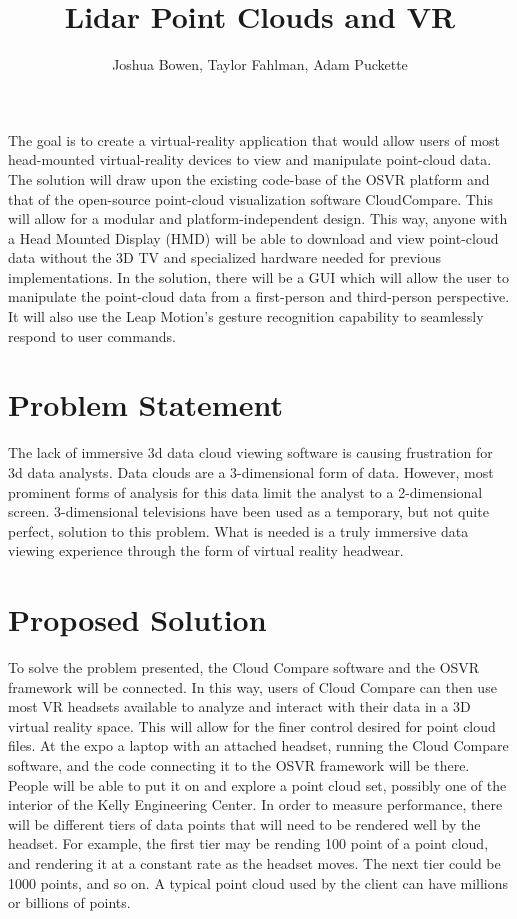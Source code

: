 \documentclass{article}
\begin{document}
\title{Lidar Point Clouds and VR}
\author{Joshua Bowen, Taylor Fahlman, Adam Puckette}

\maketitle

\abstract

The goal is to create a virtual-reality application that would allow users of most head-mounted virtual-reality devices to view and manipulate point-cloud data. The solution will draw upon the existing code-base of the OSVR platform and that of the open-source point-cloud visualization software CloudCompare. This will allow for a modular and platform-independent design. This way, anyone with a Head Mounted Display (HMD) will be able to download and view point-cloud data without the 3D TV and specialized hardware needed for previous implementations. In the solution, there will be a GUI which will allow the user to manipulate the point-cloud data from a first-person and third-person perspective. It will also use the Leap Motion's gesture recognition capability to seamlessly respond to user commands.


\section*{Problem Statement}

The lack of immersive 3d data cloud viewing software is causing frustration for 3d data analysts. Data clouds are a 3-dimensional form of data. However, most prominent forms of analysis for this data limit the analyst to a 2-dimensional screen. 3-dimensional televisions have been used as a temporary, but not quite perfect, solution to this problem. What is needed is a truly immersive data viewing experience through the form of virtual reality headwear.

\section*{Proposed Solution}

To solve the problem presented, the Cloud Compare software and the OSVR framework will be connected. In this way, users of Cloud Compare can then use most VR headsets available to analyze and interact with their data in a 3D virtual reality space. This will allow for the finer control desired for point cloud files. At the expo a laptop with an attached headset, running the Cloud Compare software, and the code connecting it to the OSVR framework will be there. People will be able to put it on and explore a point cloud set, possibly one of the interior of the Kelly Engineering Center. In order to measure performance, there will be different tiers of data points that will need to be rendered well by the headset. For example, the first tier may be rending 100 point of a point cloud, and rendering it at a constant rate as the headset moves. The next tier could be 1000 points, and so on. A typical point cloud used by the client can have millions or billions of points. 
\end{document}
